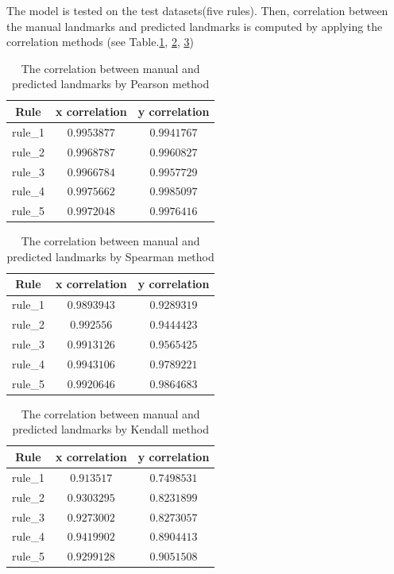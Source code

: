 \documentclass[12pt,a4paper]{article}
\begin{document}
The model is tested on the test datasets(five rules). Then, correlation between the manual landmarks and predicted landmarks is computed by applying the correlation methods (see Table.\ref{pearson}, \ref{spearman}, \ref{kendall})
\begin{table}[h!]
	\centering
	\begin{tabular}{c c c}
		Rule & x correlation & y correlation \\ \hline
		rule\_1 & $0.9953877$ & $0.9941767$ \\ \hline
		rule\_2 & $0.9968787$ & $0.9960827$ \\ \hline
		rule\_3 & $0.9966784$ & $0.9957729$ \\ \hline
		rule\_4 & $0.9975662$ & $0.9985097$ \\ \hline
		rule\_5 & $0.9972048$ & $0.9976416$ \\ \hline
	\end{tabular}
	\caption{The correlation between manual and predicted landmarks by Pearson\cite{pallant2013spss} method}
	\label{pearson}
\end{table}
\begin{table}[h!]
	\centering
	\begin{tabular}{c c c}
		Rule & x correlation & y correlation \\ \hline
		rule\_1 & $0.9893943$ & $0.9289319$ \\ \hline
		rule\_2 & $0.992556$ & $0.9444423$ \\ \hline
		rule\_3 & $0.9913126$ & $0.9565425$ \\ \hline
		rule\_4 & $0.9943106$ & $0.9789221$ \\ \hline
		rule\_5 & $0.9920646$ & $0.9864683$ \\ \hline
	\end{tabular}
	\caption{The correlation between manual and predicted landmarks by Spearman\cite{myers2010research} method}
	\label{spearman}
\end{table}
\begin{table}[h!]
	\centering
	\begin{tabular}{c c c}
		Rule & x correlation & y correlation \\ \hline
		rule\_1 & $0.913517$ & $0.7498531$ \\ \hline
		rule\_2 & $0.9303295$ & $0.8231899$ \\ \hline
		rule\_3 & $0.9273002$ & $0.8273057$ \\ \hline
		rule\_4 & $0.9419902$ & $0.8904413$ \\ \hline
		rule\_5 & $0.9299128$ & $0.9051508$ \\ \hline
	\end{tabular}
	\caption{The correlation between manual and predicted landmarks by Kendall\cite{kendall1938new} method}
	\label{kendall}
\end{table}
\end{document}

